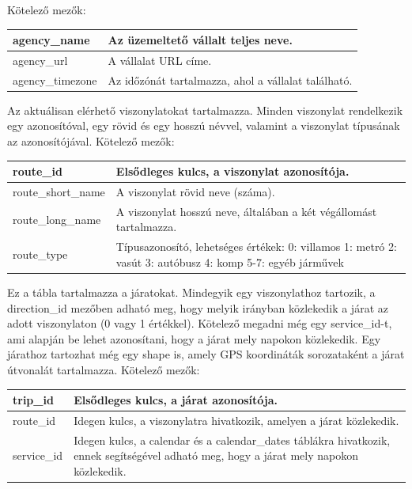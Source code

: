 Kötelező mezők:

\begin{tabular}{|p{3cm}|p{10cm}|}
\hline
agency\_name & Az üzemeltető vállalt teljes neve. \\
\hline
agency\_url & A vállalat URL címe. \\
\hline
agency\_timezone & Az időzónát tartalmazza, ahol a vállalat található. \\
\hline
\end{tabular}


Az aktuálisan elérhető viszonylatokat tartalmazza. Minden viszonylat rendelkezik egy azonosítóval, egy rövid és egy hosszú névvel, valamint a viszonylat típusának az azonosítójával.
Kötelező mezők:

\begin{tabular}{|p{3cm}|p{10cm}|}
\hline
route\_id & Elsődleges kulcs, a viszonylat azonosítója. \\
\hline
route\_short\_name & A viszonylat rövid neve (száma). \\
\hline
route\_long\_name & A viszonylat hosszú neve, általában a két végállomást tartalmazza. \\
\hline
route\_type & Típusazonosító, lehetséges értékek:
0: villamos
1: metró
2: vasút
3: autóbusz
4: komp
5-7: egyéb járművek \\
\hline
\end{tabular}


Ez a tábla tartalmazza a járatokat. Mindegyik egy viszonylathoz tartozik, a direction\_id mezőben adható meg, hogy melyik irányban közlekedik a járat az adott viszonylaton (0 vagy 1 értékkel). Kötelező megadni még egy service\_id-t, ami alapján be lehet azonosítani, hogy a járat mely napokon közlekedik. Egy járathoz tartozhat még egy shape is, amely GPS koordináták sorozataként a járat útvonalát tartalmazza.
Kötelező mezők:

\begin{tabular}{|p{3cm}|p{10cm}|}
\hline
trip\_id & Elsődleges kulcs, a járat azonosítója. \\
\hline
route\_id & Idegen kulcs, a viszonylatra hivatkozik, amelyen a járat közlekedik. \\
\hline
service\_id & Idegen kulcs, a calendar és a calendar\_dates táblákra hivatkozik, ennek segítségével adható meg, hogy a járat mely napokon közlekedik. \\
\hline
\end{tabular}

